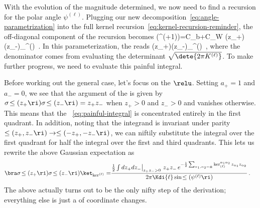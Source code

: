 With the evolution of the magnitude determined, we now need to find a recursion for the polar angle $\psi^{(\ell)}$. Plugging our new decomposition~\eqref{eq:angle-parametrization} into the full kernel recursion~\eqref{eq:kernel-recursion-reminder}, the off-diagonal component of the recursion becomes
\be\label{eq:off-diagonal-recursion}
\cos\!\le(\psi^{(\ell+1)}\ri)=C_b+C_W \bra\sigma\!\le(z_{+}\ri)\sigma\!\le(z_{-}\ri)\ket_{\ker^{(\ell)}}\, .
\ee
In this parameterization, the  reads 
\be\label{eq:painful-integral}
 \bra\sigma\!\le(z_{+}\ri)\sigma\!\le(z_{-}\ri)\ket_{\ker^{(\ell)}}\equiv {}\, ,
 \ee
 where the denominator comes from evaluating the determinant $\sqrt{\dete{2\pi K^{(\ell)}}}$.
 To make further progress, we need to evaluate this painful integral.



Before working out the general case, let's focus on the $\relu$.
Setting $a_{+}=1$ and $a_{-}=0$, we see that the argument of the  is given by $\sigma\!\le(z_{+}\ri)\sigma\!\le(z_{-}\ri)=z_{+}z_{-}$ when $z_{+}>0$ and $z_{-}>0$ and vanishes otherwise. This means that the ~\eqref{eq:painful-integral} is concentrated entirely in the first quadrant. In addition, noting that the integrand is invariant under parity $\le(z_{+},z_{-}\ri)\to\le(-z_{+},-z_{-}\ri)$, we can niftily substitute the integral over the first quadrant for half the integral over the first and third quadrants. This lets us rewrite the above Gaussian expectation as
\begin{align}\label{eq:nifty-step} 
\bra\sigma\!\le(z_{+}\ri)\sigma\!\le(z_{-}\ri)\ket_{\ker^{(\ell)}}
=&\frac{\frac{1}{2}\int dz_{+} dz_{-}\big\vert_{z_{+}z_{-}>0}\ z_{+}z_{-}\, e^{-\frac{1}{2}\sum_{\alpha_1,\alpha_2=\pm}\ker^{\alpha_1\alpha_2}_{(\ell)}z_{\alpha_1}z_{\alpha_2}}}{2\pi\Kdi{\ell}\sin\!\le(\psi^{(\ell)}\ri)}\, .
\end{align}
The above actually turns out to be the only nifty step of the derivation; everything else is just a  of coordinate changes.

